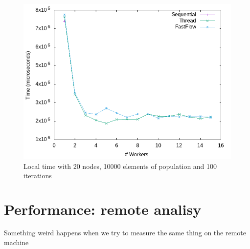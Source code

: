 \documentclass{article}
\begin{document}
    \begin{figure}
        \includegraphics[width=\linewidth]{img/local_20_10000_100_rand_t.png}
        \caption{Local time with 20 nodes, 10000 elements of population and 100 iterations}
        \label{fig:local_time}
    \end{figure}

    \section{Performance: remote analisy}\label{sec:s4}
	Something weird happens when we try to measure the same thing on the remote machine
\end{document}
